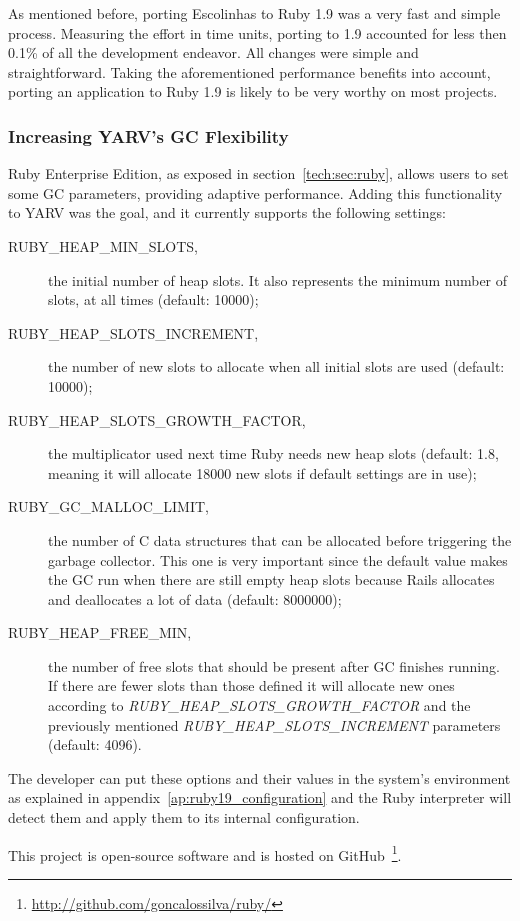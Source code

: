 As mentioned before, porting Escolinhas to Ruby 1.9 was a very fast and simple process. Measuring the effort in time units, porting to 1.9 accounted for less then 0.1\% of all the development endeavor. All changes were simple and straightforward. Taking the aforementioned performance benefits into account, porting an application to Ruby 1.9 is likely to be very worthy on most projects.

\subsubsection{Increasing YARV's GC Flexibility}
Ruby Enterprise Edition, as exposed in section~\ref{tech:sec:ruby}, allows users to set some GC parameters, providing adaptive performance. Adding this functionality to YARV was the goal, and it currently supports the following settings:
\begin{description}
  \item[RUBY\_HEAP\_MIN\_SLOTS,] the initial number of heap slots. It also represents the minimum number of slots, at all times (default: 10000);
  \item[RUBY\_HEAP\_SLOTS\_INCREMENT,] the number of new slots to allocate when all initial slots are used (default: 10000);
  \item[RUBY\_HEAP\_SLOTS\_GROWTH\_FACTOR,] the multiplicator used next time Ruby needs new heap slots (default: 1.8, meaning it will allocate 18000 new slots if default settings are in use);
  \item[RUBY\_GC\_MALLOC\_LIMIT,] the number of C data structures that can be allocated before triggering the garbage collector. This one is very important since the default value makes the GC run when there are still empty heap slots because Rails allocates and deallocates a lot of data (default: 8000000);
  \item[RUBY\_HEAP\_FREE\_MIN,] the number of free slots that should be present after GC finishes running. If there are fewer slots than those defined it will allocate new ones according to \textit{RUBY\_HEAP\_SLOTS\_GROWTH\_FACTOR} and the previously mentioned \textit{RUBY\_HEAP\_SLOTS\_INCREMENT} parameters (default: 4096).
\end{description}
The developer can put these options and their values in the system's environment as explained in appendix~\ref{ap:ruby19_configuration} and the Ruby interpreter will detect them and apply them to its internal configuration.

This project is open-source software and is hosted on GitHub~\footnote{\url{http://github.com/goncalossilva/ruby/}}.

